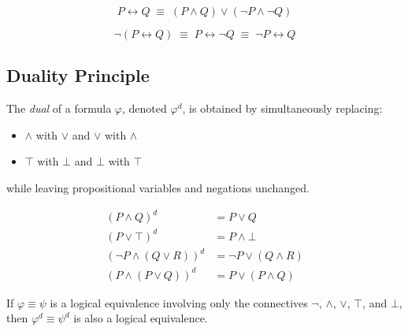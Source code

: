 \begin{theorem}
\[
P \leftrightarrow Q \;\equiv\; (P \wedge Q) \vee (\neg P \wedge \neg Q)
\]
\end{theorem}

\begin{theorem}
\[
\neg(P \leftrightarrow Q) \;\equiv\; P \leftrightarrow \neg Q \;\equiv\; \neg P \leftrightarrow Q
\]
\end{theorem}

\subsection{Duality Principle}

\begin{definition}
The \emph{dual} of a formula $\varphi$, denoted $\varphi^d$, is obtained by
simultaneously replacing:
\begin{itemize}
  \item $\wedge$ with $\vee$ and $\vee$ with $\wedge$
  \item $\top$ with $\bot$ and $\bot$ with $\top$
\end{itemize}
while leaving propositional variables and negations unchanged.
\end{definition}

\begin{example}
\begin{align*}
(P \wedge Q)^d &= P \vee Q \\
(P \vee \top)^d &= P \wedge \bot \\
(\neg P \wedge (Q \vee R))^d &= \neg P \vee (Q \wedge R) \\
(P \wedge (P \vee Q))^d &= P \vee (P \wedge Q)
\end{align*}
\end{example}

\begin{theorem}
If $\varphi \equiv \psi$ is a logical equivalence involving only the connectives
$\neg$, $\wedge$, $\vee$, $\top$, and $\bot$, then $\varphi^d \equiv \psi^d$ is
also a logical equivalence.
\end{theorem}

